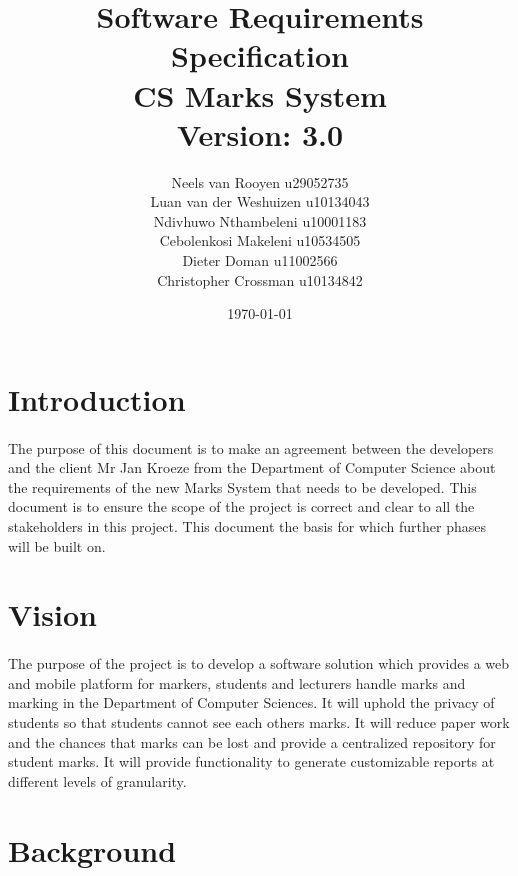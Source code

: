 \documentclass[12pt,a4paper]{article}
\begin{document}
\begin{titlepage}
\title{Software Requirements Specification\\CS Marks System\\ \small Version: 3.0}
\date{\today}
\author{Neels van Rooyen u29052735\\
Luan van der Weshuizen u10134043\\
Ndivhuwo Nthambeleni u10001183\\
Cebolenkosi Makeleni u10534505\\
Dieter Doman u11002566\\
Christopher Crossman u10134842}
\maketitle
\end{titlepage}
\tableofcontents
\pagebreak
\section{Introduction}
\paragraph{}
The purpose of this document is to make an agreement between the developers and the client Mr Jan Kroeze from the Department of Computer Science about the requirements of the new Marks System that needs to be developed. This document is to ensure the scope of the project is correct and clear to all the stakeholders in this project. This document the basis for which further phases will be built on.
\section{Vision}
\paragraph{}
The purpose of the project is to develop a software solution which provides a web and mobile platform for markers, students and lecturers handle marks and marking in the Department of Computer Sciences. It will uphold the privacy of students so that students cannot see each others marks. It will reduce paper work and the chances that marks can be lost and provide a centralized repository for student marks. It will provide functionality to generate customizable reports at different levels of granularity.
\section{Background}
\end{document}
